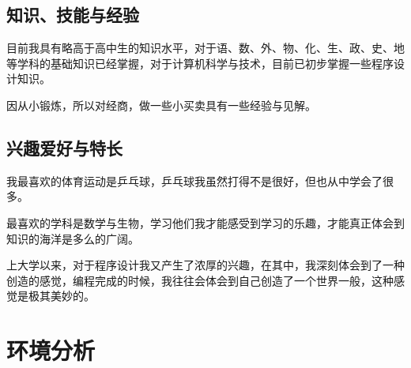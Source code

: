 \documentclass{article}
\begin{document}
\subsection{知识、技能与经验}
目前我具有略高于高中生的知识水平，对于语、数、外、物、化、生、政、史、地等学科的基础知识已经掌握，对于计算机科学与技术，目前已初步掌握一些程序设计知识。\par
因从小锻炼，所以对经商，做一些小买卖具有一些经验与见解。
\subsection{兴趣爱好与特长}
我最喜欢的体育运动是乒乓球，乒乓球我虽然打得不是很好，但也从中学会了很多。\par
最喜欢的学科是数学与生物，学习他们我才能感受到学习的乐趣，才能真正体会到知识的海洋是多么的广阔。\par
上大学以来，对于程序设计我又产生了浓厚的兴趣，在其中，我深刻体会到了一种创造的感觉，编程完成的时候，我往往会体会到自己创造了一个世界一般，这种感觉是极其美妙的。\par
\section{环境分析}
\par
\end{document}
